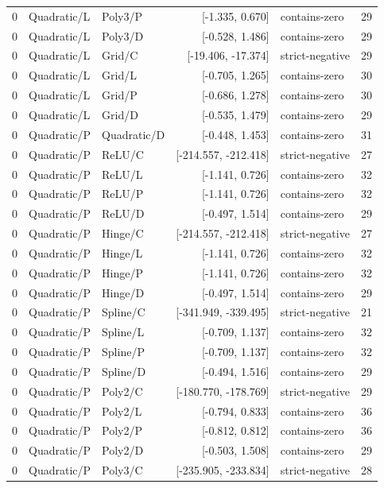 \begin{longtable}{lllrlr}
0 & Quadratic/L & Poly3/P & [-1.335, 0.670] & contains-zero & 29 \\
0 & Quadratic/L & Poly3/D & [-0.528, 1.486] & contains-zero & 29 \\
0 & Quadratic/L & Grid/C & [-19.406, -17.374] & strict-negative & 29 \\
0 & Quadratic/L & Grid/L & [-0.705, 1.265] & contains-zero & 30 \\
0 & Quadratic/L & Grid/P & [-0.686, 1.278] & contains-zero & 30 \\
0 & Quadratic/L & Grid/D & [-0.535, 1.479] & contains-zero & 29 \\
0 & Quadratic/P & Quadratic/D & [-0.448, 1.453] & contains-zero & 31 \\
0 & Quadratic/P & ReLU/C & [-214.557, -212.418] & strict-negative & 27 \\
0 & Quadratic/P & ReLU/L & [-1.141, 0.726] & contains-zero & 32 \\
0 & Quadratic/P & ReLU/P & [-1.141, 0.726] & contains-zero & 32 \\
0 & Quadratic/P & ReLU/D & [-0.497, 1.514] & contains-zero & 29 \\
0 & Quadratic/P & Hinge/C & [-214.557, -212.418] & strict-negative & 27 \\
0 & Quadratic/P & Hinge/L & [-1.141, 0.726] & contains-zero & 32 \\
0 & Quadratic/P & Hinge/P & [-1.141, 0.726] & contains-zero & 32 \\
0 & Quadratic/P & Hinge/D & [-0.497, 1.514] & contains-zero & 29 \\
0 & Quadratic/P & Spline/C & [-341.949, -339.495] & strict-negative & 21 \\
0 & Quadratic/P & Spline/L & [-0.709, 1.137] & contains-zero & 32 \\
0 & Quadratic/P & Spline/P & [-0.709, 1.137] & contains-zero & 32 \\
0 & Quadratic/P & Spline/D & [-0.494, 1.516] & contains-zero & 29 \\
0 & Quadratic/P & Poly2/C & [-180.770, -178.769] & strict-negative & 29 \\
0 & Quadratic/P & Poly2/L & [-0.794, 0.833] & contains-zero & 36 \\
0 & Quadratic/P & Poly2/P & [-0.812, 0.812] & contains-zero & 36 \\
0 & Quadratic/P & Poly2/D & [-0.503, 1.508] & contains-zero & 29 \\
0 & Quadratic/P & Poly3/C & [-235.905, -233.834] & strict-negative & 28 \\

\end{longtable}
